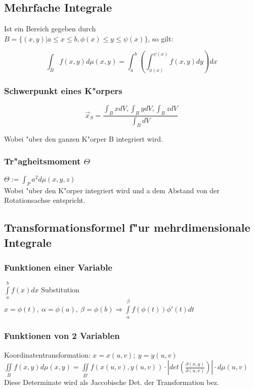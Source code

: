 \documentclass[10pt, a4paper, twocolumn]{scrartcl}
\begin{document}
\subsection{Mehrfache Integrale}

Ist ein Bereich gegeben durch\\
$B=\{(x,y)|a\leq x\leq b, \phi(x)\leq y \leq \psi(x)\}$, so gilt:

$$\int_B f(x,y)d\mu(x,y)=\int^b_a(\int^{\psi(x)}_{\phi(x)}f(x,y)dy)dx$$

\subsubsection{Schwerpunkt eines K"orpers}

$$\vec{x}_S=\frac{\int_B xdV,\int_B ydV,\int_B zdV}{\int_B dV}$$

Wobei "uber den ganzen K"orper B integriert wird.

\subsubsection{Tr"agheitsmoment $\Theta$}

$\Theta:=\int_P a^2d\mu(x,y,z)$\\

Wobei "uber den K"orper integriert wird und a dem Abstand von der Rotationsachse entspricht.

\subsection{Transformationsformel f"ur mehrdimensionale Integrale}

\subsubsection{Funktionen einer Variable}

$\int\limits^b_a f(x)dx$ Substitution $x=\phi(t),\:\alpha=\phi(a),\:\beta=\phi(b)\Rightarrow\int\limits^\beta_\alpha f(\phi(t))\phi'(t)dt$\\

\subsubsection{Funktionen von 2 Variablen}
Koordinatentransformation: $x=x(u,v);\:y=y(u,v)$\\
$\iint\limits_B f(x,y)d\mu(x,y)=\iint\limits_{B'}f(x(u,v),y(u,v))\cdotp|det(\frac{\partial(x,y)}{\partial(u,v)})|\cdotp d\mu(u,v)$\\
Diese Determinate wird als Jaccobische Det. der Transformation bez.\\
\end{document}
